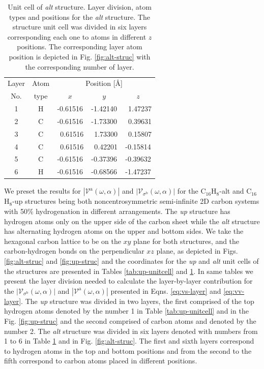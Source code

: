 \documentclass[prb,11pt,tightenlines,twocolumn,aps]{revtex4-1}
\begin{document}
\begin{table}[t]
\center
\begin{tabular}{ccccc}\\
\hline
\quad Layer \quad & \quad Atom \qquad & \multicolumn{3}{c}{Position [\AA]} \\
\cline{3-5}
\quad No.   \quad & \quad type \qquad & $x$ & $y$ & $z$  \\
\hline
1 & H &  -0.61516 &  -1.42140 & \ 1.47237 \\
2 & C &  -0.61516 &  -1.73300 & \ 0.39631 \\
3 & C & \ 0.61516 & \ 1.73300 & \ 0.15807 \\
4 & C & \ 0.61516 & \ 0.42201 &  -0.15814 \\
5 & C &  -0.61516 &  -0.37396 &  -0.39632 \\
6 & H &  -0.61516 &  -0.68566 &  -1.47237 \\
\hline
\end{tabular}

\caption{Unit cell of \emph{alt} structure. Layer division, atom types and
positions for the \emph{alt} structure. The structure unit cell was divided in
six layers corresponding each one to atoms in different $z$ positions. The
corresponding layer atom position is depicted in Fig. \ref{fig:alt-struc} with
the corresponding number of layer.}
\label{tab:alt-unitcell}
\end{table}

We preset the results for $|\mathcal{V}^{\mathrm{a}}(\omega,\alpha)|$ and
$|\mathcal{V}_{\sigma^{\mathrm{b}}}(\omega,\alpha)|$ for the
C$_{16}$H$_{8}$-alt and C$_{16}$H$_{8}$-up structures being both
noncentrosymmetric semi-infinite 2D carbon systems with 50\% hydrogenation in
different arrangements. The \emph{up} structure has hydrogen atoms only on the
upper side of the carbon sheet while the \emph{alt} structure has alternating
hydrogen atoms on the upper and bottom sides. We take the hexagonal carbon
lattice to be on the $xy$ plane for both structures, and the carbon-hydrogen
bonds on the perpendicular $xz$ plane, as depicted in Figs. \ref{fig:alt-struc}
and \ref{fig:up-struc}
% 
{\color{blue} and the coordinates for the \emph{up} and \emph{alt} unit cells
of the structures are presented in Tables \ref{tab:up-unitcell} and
% 
\ref{tab:alt-unitcell}. In same tables we present the layer division needed to
calculate the layer-by-layer contribution for the
$|\mathcal{V}_{\sigma^{\mathrm{b}}}(\omega,\alpha)|$ and
$|\mathcal{V}^{\mathrm{a}}(\omega,\alpha)|$ presented in Eqns. 
% 
\eqref{eq:vs-layer} and \eqref{eq:vv-layer}. The \emph{up} structure was
divided in two layers, the first comprised of the top hydrogen atoms denoted by
the number 1 in Table \ref{tab:up-unitcell} and in the Fig. \ref{fig:up-struc}
and the second comprised of carbon atoms and denoted by the number 2. The
\emph{alt} structure was divided in six layers denoted with numbers from 1 to 6
in Table \ref{tab:alt-unitcell} and in Fig. \ref{fig:alt-struc}. The first and
sixth layers correspond to hydrogen atoms in the top and bottom positions and
from the second to the fifth correspond to carbon atoms placed in different
positions.}
\end{document}
